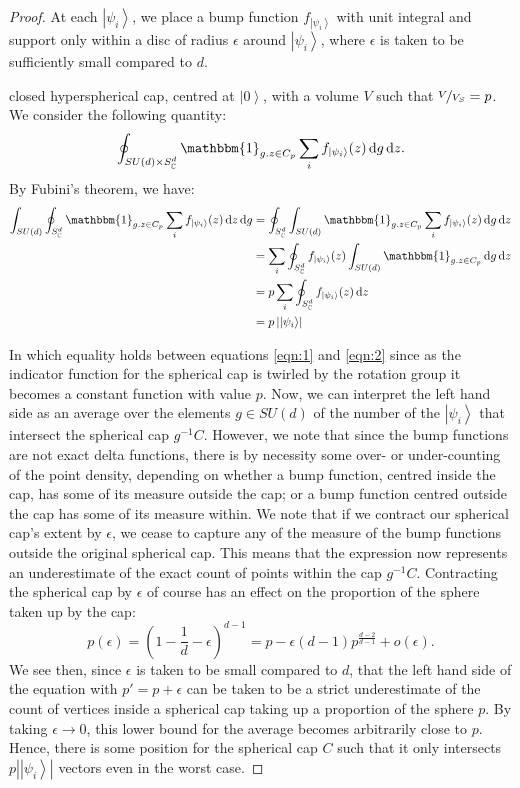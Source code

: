 \documentclass{amsart}
\theoremstyle{definition}
\newcommand{\ket}[1]{{\left\vert{#1}\right\rangle}}
\newcommand*\dif{\mathop{}\!\mathrm{d}}
\begin{document}
\begin{proof}
At each $\ket{\psi_i}$, we place a bump function $f_\ket{\psi_i}$ with unit integral and support only within a disc of radius $\epsilon$ around $\ket{\psi_i}$, where $\epsilon$ is taken to be sufficiently small compared to $d$.

closed hyperspherical cap, centred at $\ket{0}$, with a volume $V$ such that $\nicefrac{V}{V_S}=p$. We consider the following quantity:
\begin{equation}
\oint_{SU(d)\times S_\mathbb{C}^d} \mathbbm{1}_{g.z\in C_p} \sum_i f_\ket{\psi_i}(z) \dif g\dif z.
\end{equation}
By Fubini's theorem, we have:
\begin{align}
\int_{SU(d)} \oint_{S_\mathbb{C}^d} \mathbbm{1}_{g.z\in C_p} \sum_i f_\ket{\psi_i}(z) \dif z \dif g &= \oint_{S_\mathbb{C}^d} \int_{SU(d)}  \mathbbm{1}_{g.z\in C_p} \sum_i f_\ket{\psi_i}(z) \dif g \dif z \\
 &= \sum_i\oint_{S_\mathbb{C}^d}f_\ket{\psi_i}(z)  \int_{SU(d)} \mathbbm{1}_{g.z\in C_p} \dif g \dif z \label{eqn:1} \\
 &= p\sum_i\oint_{S_\mathbb{C}^d}f_\ket{\psi_i}(z)  \dif z \label{eqn:2} \\
&= p\left|\ket{\psi_i}\right|
\end{align}



In which equality holds between equations \ref{eqn:1} and \ref{eqn:2} since as the indicator function for the spherical cap is twirled by the rotation group it becomes a constant function with value $p$. Now, we can interpret the left hand side as an average over the elements $g\in SU(d)$ of the number of the $\ket{\psi_i}$ that intersect the spherical cap $g^{-1}C$. However, we note that since the bump functions are not exact delta functions, there is by necessity some over- or under-counting of the point density, depending on whether a bump function, centred inside the cap, has some of its measure outside the cap; or a bump function centred outside the cap has some of its measure within. We note that if we contract our spherical cap's extent by $\epsilon$, we cease to capture any of the measure of the bump functions outside the original spherical cap. This means that the expression now represents an underestimate of the exact count of points within the cap $g^{-1}C$. Contracting the spherical cap by $\epsilon$ of course has an effect on the proportion of the sphere taken up by the cap:
\begin{equation}
p(\epsilon)=\left(1-\frac{1}{d}-\epsilon\right)^{d-1}=p-\epsilon(d-1) p^{\frac{d-2}{d-1}} +o(\epsilon).
\end{equation}
We see then, since $\epsilon$ is taken to be small compared to $d$, that the left hand side of the equation with $p'=p+\epsilon$ can be taken to be a strict underestimate of the count of vertices inside a spherical cap taking up a proportion of the sphere $p$. By taking $\epsilon\rightarrow0$, this lower bound for the average becomes arbitrarily close to $p$. Hence, there is some position for the spherical cap $C$ such that it only intersects $p\left|\ket{\psi_i}\right|$ vectors even in the worst case.

\end{proof} 
\end{document}
